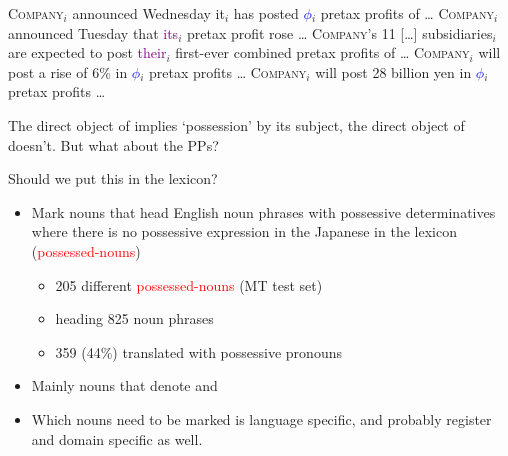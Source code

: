 \documentclass[a4paper,landscape,headrule,footrule,xetex]{foils}
\newcommand{\psp}[1]{\textcolor{purple}{#1}}
\newcommand{\dtr}[1]{\textcolor{blue}{#1}}
\newcommand{\trg}[1]{\textcolor{red}{#1}}
\begin{document}

\begin{exe}
  \ex \textsc{Company}$_i$ announced Wednesday it$_i$ has posted \dtr{$\phi$}$_i$
  pretax profits  
  of \ldots
  \ex \textsc{Company}$_i$ announced Tuesday that \psp{its}$_i$ pretax
  profit rose 
  \ldots
  \ex \textsc{Company}'s 11 [\ldots] subsidiaries$_i$ are expected to
  post \psp{their}$_i$ first-ever combined pretax profits of \ldots 
  \ex  \textsc{Company}$_i$ will  post a rise of 6\% in \dtr{$\phi$}$_i$
  pretax profits 
  \ldots
  \ex  \textsc{Company}$_i$ will  post  28 billion yen in \dtr{$\phi$}$_i$
  pretax profits 
  \ldots  

\end{exe}

The direct object of  implies `possession' by its subject,
the direct object of  doesn't.  But what about the PPs?

Should we put this in the lexicon?




\begin{itemize}
\item Mark nouns that head English noun phrases with possessive
  determinatives where there is no possessive expression in the
  Japanese in the lexicon (\trg{possessed-nouns})
   \begin{itemize}
      \item 205 different \trg{possessed-nouns} (MT test set)
      \item heading 825 noun phrases
      \item 359 (44\%) translated with possessive pronouns
    \end{itemize}
\item  Mainly nouns that denote  and   
\item Which nouns need to be marked is language specific, and probably
  register and domain specific as well.
\end{itemize}
  
\end{document}

